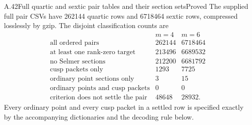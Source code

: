 \begin{statement}{A.42}{Full quartic and sextic pair tables and their section sets}{Proved}
The supplied full pair CSVs have 262144 quartic rows and 6718464 sextic
rows, compressed losslessly by gzip. The disjoint classification counts
are
\[
\begin{array}{l|r|r}
 &m=4&m=6\\\hline
\text{all ordered pairs}&262144&6718464\\
\text{at least one rank-zero target}&213496&6689532\\
\text{no Selmer sections}&212200&6681792\\
\text{cusp packets only}&1293&7725\\
\text{ordinary point sections only}&3&15\\
\text{ordinary points and cusp packets}&0&0\\
\text{criterion does not settle the pair}&48648&28932.
\end{array}
\]
Every ordinary point and every cusp packet in a settled row is specified
exactly by the accompanying dictionaries and the decoding rule below.
\end{statement}
